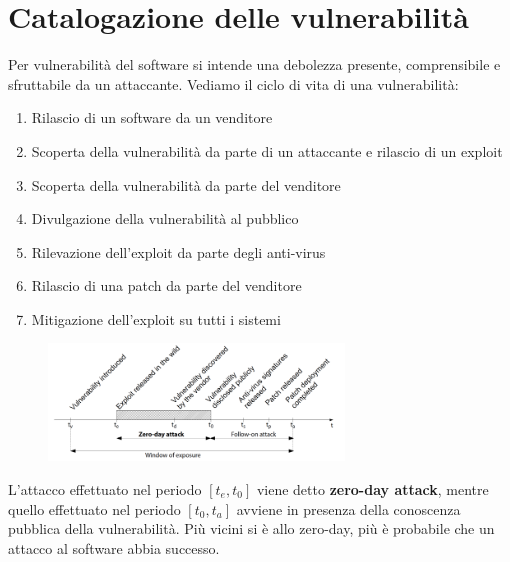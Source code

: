 \chapter{Catalogazione delle vulnerabilità}
Per vulnerabilità del software si intende una
debolezza presente, comprensibile e sfruttabile
da un attaccante. Vediamo il ciclo di vita di una vulnerabilità:
\begin{enumerate}
    \item Rilascio di un software da un venditore
    \item Scoperta della vulnerabilità da parte di un attaccante
e rilascio di un exploit
    \item Scoperta della vulnerabilità da parte del venditore
    \item Divulgazione della vulnerabilità al pubblico
    \item Rilevazione dell’exploit da parte degli anti-virus
    \item Rilascio di una patch da parte del venditore
    \item Mitigazione dell’exploit su tutti i sistemi 
\end{enumerate}

\begin{figure}[hbpt!]
    \centering
    \includegraphics[width=0.7\textwidth]{./Images/cap2/2.1.png}
\end{figure}
\FloatBarrier

L'attacco effettuato nel periodo \([t_e, t_0]\) viene detto \textbf{zero-day attack}, mentre quello effettuato nel periodo \([t_0, t_a]\) avviene in presenza della conoscenza pubblica della vulnerabilità. Più vicini si è allo zero-day, più è probabile che un attacco al software abbia successo.

\vspace{5mm}

